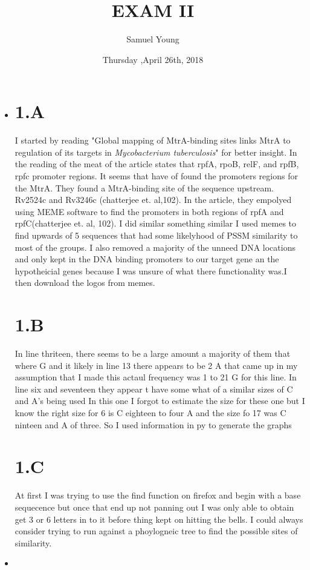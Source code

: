 \documentclass[12pt]{article}
\author{Samuel Young}
\title{EXAM  II}
\date{Thursday ,April 26th, 2018}
\begin{document}
\maketitle
\begin{itemize}
	\item
\part{1.A}
  I started by reading "Global mapping of MtrA-binding sites links MtrA to regulation of its targets in \textit{Mycobacterium tuberculosis}" for better insight.  In  the reading of the meat of the article states that rpfA, rpoB, relF, and rpfB, rpfc  promoter regions. It seems that  have of found the promoters regions for  the MtrA. They found a MtrA-binding site of the sequence upstream. Rv2524c and Rv3246c (chatterjee et. al,102). In the article, they empolyed using MEME software to find the promoters in both regions of rpfA and rpfC(chatterjee et. al, 102). I did similar something similar I used memes to find upwards of 5 sequences that had some likelyhood of PSSM  similarity to most of the groups. I also removed a majority of the unneed DNA locations and only kept in the DNA binding promoters to our target gene  an the hypotheicial genes because I was unsure of what there functionality was.I then download the logos from memes. 
\part{1.B}
  In line thriteen, there seems to be a large amount a majority of them that where G and it likely  in line 13 there appears to be 2 A that came up in my assumption that I made this actaul frequency was 1 to 21 G for this line. In line six and seventeen they appear t  have some what of a similar sizes  of C and A's being used  In this one I forgot to estimate the size for these one but I know the right size for 6  is  C eighteen  to four A and the size fo 17 was  C ninteen and A of three. So I used information in py to  generate the graphs
\part{1.C}
At first I was trying to use the find function on firefox and begin with a base sequecence but once that end up not panning out I was only able to obtain  get  3 or  6 letters in to it before thing kept on hitting the bells. I could always consider trying to run against a phoylogneic tree to find the possible sites of similarity.
	\item

\end{itemize}
\end{document}
